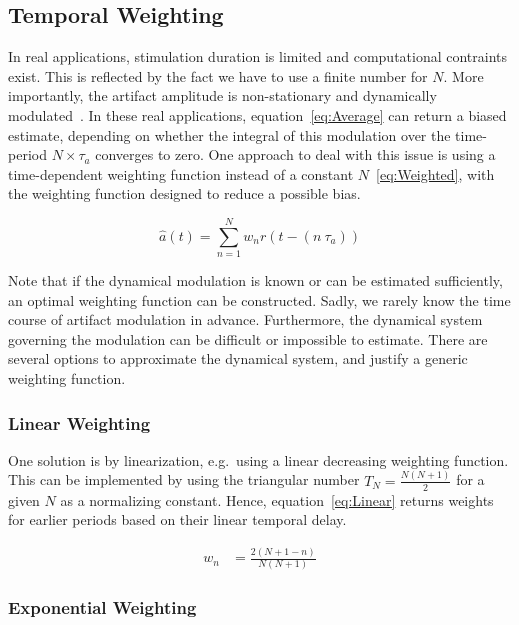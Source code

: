 \documentclass[a4paper]{article}
\begin{document}
\subsection{Temporal Weighting}

In real applications, stimulation duration is limited and computational contraints exist. This is reflected by the fact we have to use a finite number for $N$. More importantly, the artifact amplitude is non-stationary  and dynamically modulated~\citep{Noury_2016}.
In these real applications, equation~\eqref{eq:Average} can return a biased estimate, depending on whether the integral of this modulation over the time-period $N\times\tau_a$ converges to zero.
One approach to deal with this issue is using a time-dependent weighting function instead of a constant $N$~\eqref{eq:Weighted}, with the weighting function designed to reduce a possible bias.

\begin{equation}
    \hat{a}(t) = \sum_{n=1}^{N} w_n r(t - (n~\tau_a))\label{eq:Weighted}
\end{equation}

Note that if the dynamical modulation is known or can be estimated sufficiently, an optimal weighting function can be constructed. Sadly, we rarely know the time course of artifact modulation in advance. Furthermore, the dynamical system governing the modulation can be difficult or impossible to estimate. There are several options to approximate the dynamical system, and justify a generic weighting function.

\subsubsection{Linear Weighting}

One solution is by linearization, e.g.\ using a linear decreasing weighting function. This can be implemented by using the triangular number $T_N = \frac{N(N+1)}{2}$ for a given $N$ as a normalizing constant. Hence, equation~\eqref{eq:Linear} returns weights for earlier periods based on their linear temporal delay.

\begin{align}
    w_n & = \frac{2(N+1-n)}{N(N+1)}\label{eq:Linear}
\end{align}

\subsubsection{Exponential Weighting}
\end{document}
